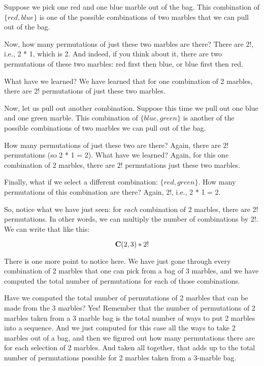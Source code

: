 \documentclass[../../../main.tex]{subfiles}
\begin{document}
Suppose we pick one red and one blue marble out of the bag. This combination of $\{ red, blue \}$ is one of the possible combinations of two marbles that we can pull out of the bag. 

Now, how many permutations of just these two marbles are there? There are 2!, i.e., 2 * 1, which is 2. And indeed, if you think about it, there are two permutations of these two marbles: red first then blue, or blue first then red.

What have we learned? We have learned that for one combination of 2 marbles, there are 2! permutations of just these two marbles.

Now, let us pull out another combination. Suppose this time we pull out one blue and one green marble. This combination of $\{ blue, green \}$ is another of the possible combinations of two marbles we can pull out of the bag.

How many permutations of just these two are there? Again, there are 2! permutations (so 2 * 1 = 2). What have we learned? Again, for this one combination of 2 marbles, there are 2! permutations just these two marbles.

Finally, what if we select a different combination: $\{ red, green \}$. How many permutations of this combination are there? Again, 2!, i.e., 2 * 1 = 2. 

So, notice what we have just seen: for \emph{each} combination of 2 marbles, there are 2! permutations. In other words, we can multiply the number of combinations by 2!. We can write that like this:

\begin{equation*}
  \mathbf{C}(2, 3) * 2!
\end{equation*}

\noindent
There is one more point to notice here. We have just gone through every combination of 2 marbles that one can pick from a bag of 3 marbles, and we have computed the total number of permutations for each of those combinations. 

Have we computed the total number of permutations of 2 marbles that can be made from the 3 marbles? Yes! Remember that the number of permutations of 2 marbles taken from a 3 marble bag is the total number of ways to put 2 marbles into a sequence. And we just computed for this case all the ways to take 2 marbles out of a bag, and then we figured out how many permutations there are for each selection of 2 marbles. And taken all together, that adds up to the total number of permutations possible for 2 marbles taken from a 3-marble bag. 
\end{document}
